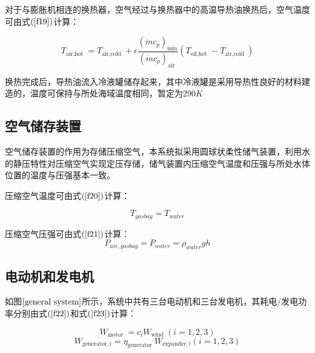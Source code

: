 \documentclass{jnuthesis}
\begin{document}
	对于与膨胀机相连的换热器，空气经过与换热器中的高温导热油换热后，空气温度可由式$ (\fontsize{10.5bp}{10pt}\ref{f19}) $计算：
	
	\begin{equation}\label{f19}
		T_{\text {air,hot }}=T_{\text {air,cold }}+\epsilon \frac{\left(\dot{m} c_{p}\right)_{\min }}{\left(\dot{m} c_{p}\right)_{\text {air }}}\left(T_{\text {oil,hot }}-T_{\text {air,cold }}\right)
	\end{equation}
	
	换热完成后，导热油流入冷液罐储存起来，其中冷液罐是采用导热性良好的材料建造的，温度可保持与所处海域温度相同，暂定为$ 290K $
	
	
	\subsection{空气储存装置}
	
	
	空气储存装置的作用为存储压缩空气，本系统拟采用圆球状柔性储气装置，利用水的静压特性对压缩空气实现定压存储，储气装置内压缩空气温度和压强与所处水体位置的温度与压强基本一致。
	\par 
	压缩空气温度可由式$ (\fontsize{10.5bp}{10pt}\ref{f20}) $计算：
	
	\begin{equation}
		T_{gasbag}=T_{water}
		\label{f20}
	\end{equation}
	
	压缩空气压强可由式$ (\fontsize{10.5bp}{10pt}\ref{f21}) $计算：\\
	\begin{equation}
		P_{air,gasbag}=P_{water}=\rho_{water}gh
		\label{f21}
	\end{equation}
	
	\subsection{电动机和发电机}
	
	
	如图$ \fontsize{10.5bp}{10pt}\ref{general system} $所示，系统中共有三台电动机和三台发电机，其耗电/发电功率分别由式$ (\fontsize{10.5bp}{10pt}\ref{f22}) $和式$ (\fontsize{10.5bp}{10pt}\ref{f23}) $计算：
	
	\begin{equation}
		W_{\text {motor }}=c_{i} W_{\text {wind }}(i=1,2,3)
		\label{f22}
	\end{equation}
	\begin{equation}
		W_{\text {generator},i}=\eta_{\text {generator }} W_{\text {expander},i}(i=1,2,3)
		\label{f23}
	\end{equation}
	
\end{document}
